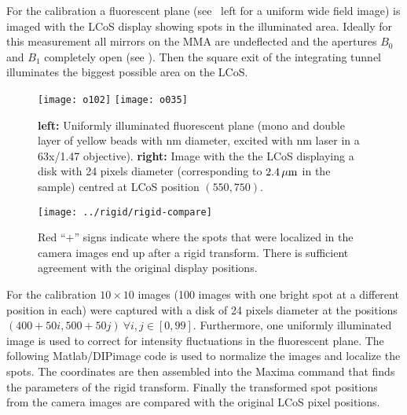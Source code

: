 For the calibration a fluorescent plane (see
~left for a uniform wide field image) is imaged
with the LCoS display showing spots in the illuminated area.  Ideally
for this measurement all mirrors on the MMA are undeflected and the
apertures $B_0$ and $B_1$ completely open (see
). Then the square exit of the integrating
tunnel illuminates the biggest possible area on the LCoS.

\begin{figure}[!hbt]
  \centering
  \texttt{[image: o102]}
  \texttt{[image: o035]}
  \caption{{\bf left:} Uniformly illuminated fluorescent plane (mono
    and double layer of yellow beads with \unit[110]{nm} diameter,
    excited with \unit[473]{nm} laser in a 63x/1.47 objective). {\bf
      right:} Image with the the LCoS displaying a disk with 24 pixels
    diameter (corresponding to $\unit[2.4]{\mu m}$ in the sample)
    centred at LCoS position $(550,750)$.}
  \label{fig:rigid-pics}
\end{figure}


\begin{figure}[!hbt]
  \centering
  \texttt{[image: ../rigid/rigid-compare]}
  \caption{Red ``$+$'' signs indicate where the spots that were
    localized in the camera images end up after a rigid
    transform. There is sufficient agreement with the original
    display positions.}
  \label{fig:rigid-compare}
\end{figure}

For the calibration $10\times10$ images (100 images with one bright
spot at a different position in each) were captured with a disk of 24
pixels diameter at the positions $(400+50i,500+50j)\ \forall i,j\in
[0,99]$. Furthermore, one uniformly illuminated image is used to
correct for intensity fluctuations in the fluorescent plane.  The
following Matlab/DIPimage code is used to normalize the images and
localize the spots. The coordinates are then assembled into the Maxima
command that finds the parameters of the rigid transform. Finally the
transformed spot positions from the camera images are compared with
the original LCoS pixel positions.

